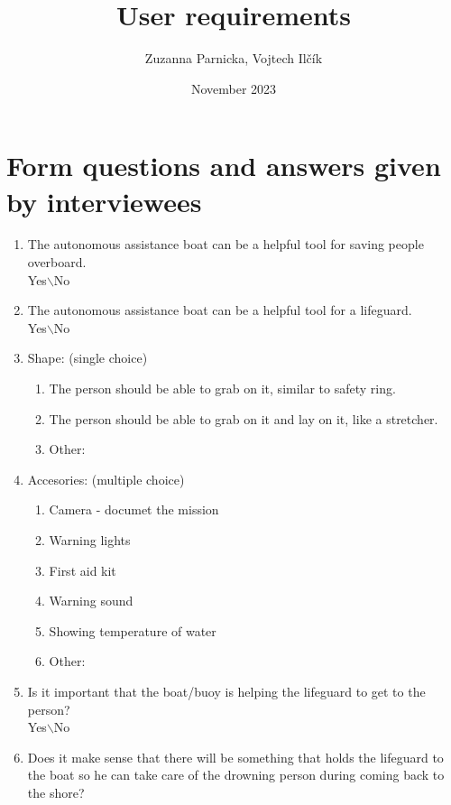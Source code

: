 \documentclass{article}[10pt]
\title{User requirements}
\author{Zuzanna Parnicka, Vojtech Il\v{c}\'{i}k}
\date{November 2023}
\begin{document}
\maketitle

\section*{Form questions and answers given by interviewees}
\begin{enumerate}
    
   
    \item The autonomous assistance boat can be a helpful tool for saving people overboard.\\
            Yes$\backslash$No
    \item The autonomous assistance boat can be a helpful tool for a lifeguard.\\
            Yes$\backslash$No
    \item Shape: (single choice)
    \begin{enumerate}
        \item  The person should be able to grab on it, similar to safety ring.\\
        \item  The person should be able to grab on it and lay on it, like a stretcher.\\
        \item  Other:
    \end{enumerate}
    \item Accesories: (multiple choice)
    \begin{enumerate}
        \item Camera - documet the mission\\
        \item Warning lights\\
        \item First aid kit\\
        \item Warning sound\\
        \item Showing temperature of water\\
        \item Other:
    \end{enumerate}
    \item Is it important that the boat/buoy is helping the lifeguard to get to the person?\\
            Yes$\backslash$No
    \item Does it make sense that there will be something that holds the lifeguard to the boat so he can take care of the drowning person during coming back to the shore?\\

\end{enumerate}
\end{document}
